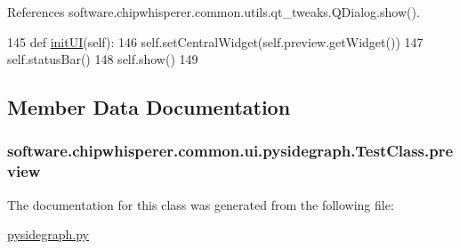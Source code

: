 References software.\+chipwhisperer.\+common.\+utils.\+qt\+\_\+tweaks.\+Q\+Dialog.\+show().


\begin{DoxyCode}
145     \textcolor{keyword}{def }\hyperlink{classsoftware_1_1chipwhisperer_1_1common_1_1ui_1_1pysidegraph_1_1TestClass_aa66e4623ba95f4fb3717799a71b97555}{initUI}(self):
146         self.setCentralWidget(self.preview.getWidget())
147         self.statusBar()
148         self.show()
149                                        
\end{DoxyCode}


\subsection{Member Data Documentation}
\hypertarget{classsoftware_1_1chipwhisperer_1_1common_1_1ui_1_1pysidegraph_1_1TestClass_a7d86eba82a32bc11be54381ace60e91e}{}
\subsubsection[{preview}]{\setlength{\rightskip}{0pt plus 5cm}software.\+chipwhisperer.\+common.\+ui.\+pysidegraph.\+Test\+Class.\+preview}\label{classsoftware_1_1chipwhisperer_1_1common_1_1ui_1_1pysidegraph_1_1TestClass_a7d86eba82a32bc11be54381ace60e91e}


The documentation for this class was generated from the following file\+:\begin{DoxyCompactItemize}
\item 
\hyperlink{pysidegraph_8py}{pysidegraph.\+py}\end{DoxyCompactItemize}

